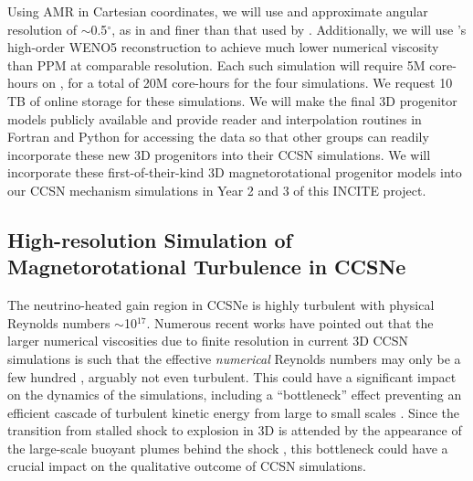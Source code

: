 Using AMR in Cartesian coordinates, we will use and approximate angular resolution of $\sim$0.5$^\circ$, as in \citep{Couch:2015a} and finer than that used by \citep{Muller:2017}.
Additionally, we will use \spark's high-order WENO5 reconstruction to achieve much lower numerical viscosity than PPM at comparable resolution.
Each such simulation will require 5M core-hours on \mira, for a total of 20M core-hours for the four simulations.
We request 10 TB of online storage for these simulations.
We will make the final 3D progenitor models publicly available and provide reader and interpolation routines in Fortran and Python for accessing the data so that other groups can readily incorporate these new 3D progenitors into their CCSN simulations.
We will incorporate these first-of-their-kind 3D magnetorotational progenitor models into our CCSN mechanism simulations in Year 2 and 3 of this INCITE project.

\subsection{High-resolution Simulation of Magnetorotational Turbulence in CCSNe}
\label{sec:Y1hero}

The neutrino-heated gain region in CCSNe is highly turbulent with physical Reynolds numbers $\sim$10$^{17}$.
Numerous recent works have pointed out that the larger numerical viscosities due to finite resolution in current 3D CCSN simulations is such that the effective {\it numerical} Reynolds numbers may only be a few hundred \citep{Couch:2015, Abdikamalov:2015, Radice:2015, Radice:2016}, arguably not even turbulent.
This could have a significant impact on the dynamics of the simulations, including a ``bottleneck'' effect preventing an efficient cascade of turbulent kinetic energy from large to small scales \citep{Hanke:2012, Couch:2013a, Abdikamalov:2015, Radice:2016}.
Since the transition from stalled shock to explosion in 3D is attended by the appearance of the large-scale buoyant plumes behind the shock \citep{Dolence:2013, Muller:2017}, this bottleneck could have a crucial impact on the qualitative outcome of CCSN simulations.

